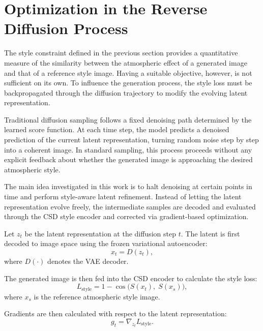 \FloatBarrier
\section{Optimization in the Reverse Diffusion Process}
\label{sec:ch7_latent_opt}

The style constraint defined in the previous section provides a quantitative measure of the similarity between the atmospheric effect of a generated image and that of a reference style image. Having a suitable objective, however, is not sufficient on its own. To influence the generation process, the style loss must be backpropagated through the diffusion trajectory to modify the evolving latent representation.

Traditional diffusion sampling follows a fixed denoising path determined by the learned score function. At each time step, the model predicts a denoised prediction of the current latent representation, turning random noise step by step into a coherent image. In standard sampling, this process proceeds without any explicit feedback about whether the generated image is approaching the desired atmospheric style.

The main idea investigated in this work is to halt denoising at certain points in time and perform style-aware latent refinement. Instead of letting the latent representation evolve freely, the intermediate samples are decoded and evaluated through the CSD style encoder and corrected via gradient-based optimization.

Let $z_t$ be the latent representation at the diffusion step $t$. The latent is first decoded to image space using the frozen variational autoencoder:
\begin{equation}
    x_t = D(z_t),
\end{equation}
where $D(\cdot)$ denotes the VAE decoder.

The generated image is then fed into the CSD encoder to calculate the style loss:
\begin{equation}
    L_{\text{style}} = 1 - \cos\!\bigl(S(x_t),\; S(x_s)\bigr),
\end{equation}
where $x_s$ is the reference atmospheric style image.

Gradients are then calculated with respect to the latent representation:
\begin{equation}
    g_t = \nabla_{z_t} L_{\text{style}}.
\end{equation}


